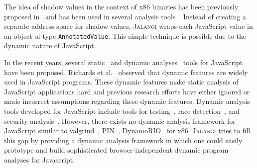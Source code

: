 \documentclass{sig-alternate}
\def\jalangi{\textsc{Jalangi}}
\begin{document}
The idea of shadow values in the context of x86 binaries has been
previously proposed
in~\cite{Nethercote:2007:VFH:1250734.1250746,Zhao:2010:1772954.1772960}
and has been used in several analysis
tools~\cite{Zhao:2010:1772954.1772960,songndss05,Bond:2007:TBA:1297027.1297057,hobbs}.
Instead of creating a separate address space for shadow values,
\jalangi{} wraps each JavaScript value in an object of type
\texttt{AnnotatedValue}.  This simple technique is possible due to the
dynamic nature of JavaScript.

In the recent years, several
static~\cite{Yu:2007:JIB:1190216.1190252,Jensen:2010:IAL:1882094.1882114,Anderson:2005:TTI:2144892.2144917,manuicse13,Wei:2012:BAJ:2384716.2384758,Sridharan:2012:CTP:2367163.2367191}
and dynamic
analyses~\cite{Petrov:2012:RDW:2254064.2254095,Richards:2010:ADB:1806596.1806598,Artzi:2011:FAT:1985793.1985871,Mesbah:2009:IAT:1555001.1555037}
tools for JavaScript have been proposed.  Richards et
al.~\cite{Richards:2010:ADB:1806596.1806598} observed that dynamic
features are widely used in JavaScript programs.  These dynamic
features make static analysis of JavaScript applications hard and
previous research efforts have either ignored or made incorrect
assumptions regarding these dynamic features.  Dynamic analysis tools
developed for JavaScript include tools for
testing~\cite{Artzi:2011:FAT:1985793.1985871,Saxena:2010:SEF:1849417.1849985},
race detection~\cite{Petrov:2012:RDW:2254064.2254095}, and security
analysis~\cite{Vikram:2009:RAS:1653662.1653685}.  However, there
exists no dynamic analysis framework for JavaScript similar to
valgrind~\cite{Nethercote:2007:VFH:1250734.1250746},
PIN~\cite{Luk:2005:PBC:1065010.1065034},
DynamoRIO~\cite{Bruening:2003:IAD:776261.776290} for x86.  \jalangi{}
tries to fill this gap by providing a dynamic analysis framework in
which one could easily prototype and build sophisticated
browser-independent dynamic program analyses for Javascript.

{\small


}
\end{document}
